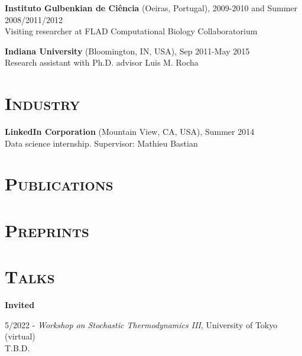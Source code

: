 \documentclass[margin,line,centered]{res}
\begin{document}
\begin{resume}
\textbf{Instituto Gulbenkian de Ciência} (Oeiras, Portugal), 2009-2010 and Summer 2008/2011/2012 \\
Visiting researcher at FLAD Computational Biology Collaboratorium

\textbf{Indiana University} (Bloomington, IN, USA), Sep 2011-May 2015\\
Research assistant with Ph.D. advisor Luis M. Rocha 

\section{\textsc{Industry}}

\textbf{LinkedIn Corporation} (Mountain View, CA, USA), Summer 2014\\
Data science internship. Supervisor: Mathieu Bastian

\section{\textsc{Publications}}


\section{\textsc{Preprints}}


\section{\textsc{Talks}}

\textbf{Invited}

5/2022 - \emph{Workshop on Stochastic Thermodynamics III}, University of Tokyo (virtual)\\
T.B.D. %


\end{resume}
\end{document}
